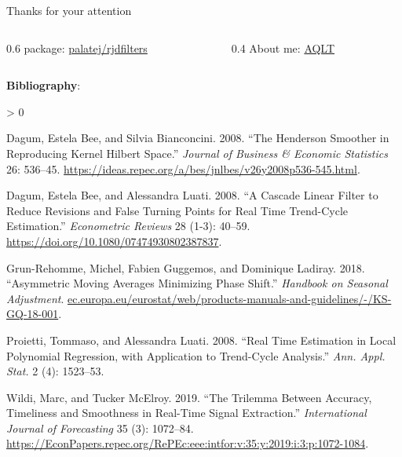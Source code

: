 \documentclass[10pt,xcolor=table,color={dvipsnames,usenames},ignorenonframetext,usepdftitle=false,english]{beamer}
\newlength{\cslhangindent}
\newenvironment{CSLReferences}[2] %
 {%
  \setlength{\parindent}{0pt}
  \ifodd #1 \everypar{\setlength{\hangindent}{\cslhangindent}}\ignorespaces\fi
  \ifnum #2 > 0
  \setlength{\parskip}{#2\baselineskip}
  \fi
 }%
 {}
\newcommand\1{\mathds{1}}
\begin{document}
\begin{frame}{Thanks for your attention}
\protect\hypertarget{thanks-for-your-attention}{}
\begin{columns}
\begin{column}{0.6\textwidth} 
 package: \href{https://github.com/palatej/rjdfilters}{\faGithub{} palatej/rjdfilters}
\end{column}
\begin{column}{0.4\textwidth}
About me: \href{https://github.com/AQLT}{\faGithub{} AQLT}  
\end{column}
\end{columns}

\textbf{Bibliography}: \footnotesize

\hypertarget{refs}{}
\begin{CSLReferences}{1}{0}
\leavevmode\hypertarget{ref-dagumbianconcini2008}{}%
Dagum, Estela Bee, and Silvia Bianconcini. 2008. {``{The Henderson
Smoother in Reproducing Kernel Hilbert Space}.''} \emph{Journal of
Business \& Economic Statistics} 26: 536--45.
\url{https://ideas.repec.org/a/bes/jnlbes/v26y2008p536-545.html}.

\leavevmode\hypertarget{ref-cascadeFilter}{}%
Dagum, Estela Bee, and Alessandra Luati. 2008. {``A Cascade Linear
Filter to Reduce Revisions and False Turning Points for Real Time
Trend-Cycle Estimation.''} \emph{Econometric Reviews} 28 (1-3): 40--59.
\url{https://doi.org/10.1080/07474930802387837}.

\leavevmode\hypertarget{ref-ch15HBSA}{}%
Grun-Rehomme, Michel, Fabien Guggemos, and Dominique Ladiray. 2018.
{``Asymmetric Moving Averages Minimizing Phase Shift.''} \emph{Handbook
on Seasonal Adjustment}.
\href{https://ec.europa.eu/eurostat/web/products-manuals-and-guidelines/-/KS-GQ-18-001}{ec.europa.eu/eurostat/web/products-manuals-and-guidelines/-/KS-GQ-18-001}.

\leavevmode\hypertarget{ref-proietti2008}{}%
Proietti, Tommaso, and Alessandra Luati. 2008. {``Real Time Estimation
in Local Polynomial Regression, with Application to Trend-Cycle
Analysis.''} \emph{Ann. Appl. Stat.} 2 (4): 1523--53.

\leavevmode\hypertarget{ref-trilemmaWMR2019}{}%
Wildi, Marc, and Tucker McElroy. 2019. {``The Trilemma Between Accuracy,
Timeliness and Smoothness in Real-Time Signal Extraction.''}
\emph{International Journal of Forecasting} 35 (3): 1072--84.
\url{https://EconPapers.repec.org/RePEc:eee:intfor:v:35:y:2019:i:3:p:1072-1084}.

\end{CSLReferences}
\end{frame}
\end{document}
